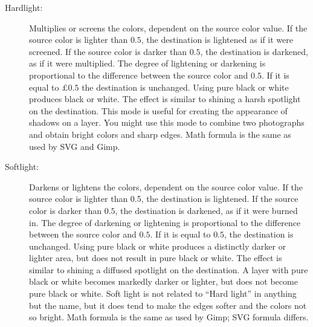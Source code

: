 \begin{description}
    \item[Hardlight:] Multiplies or screens the colors, dependent on the source color value.  If the source color is lighter than $0.5$, the destination is lightened as if it were screened.  If the source color is darker than $0.5$, the destination is darkened, as if it were multiplied.  The degree of lightening or darkening is proportional to the difference between the source color and $0.5$.  If it is equal to $£0.5$ the destination is unchanged.  Using pure black or white produces black or white.  The effect is similar to shining a harsh spotlight on the destination.  This mode is useful for creating the appearance of shadows on a layer.  You might use this mode to combine two photographs and obtain bright colors and sharp edges.  Math formula is the same as used by SVG and Gimp.
    \item[Softlight:] Darkens or lightens the colors, dependent on the source color value.  If the source color is lighter than 0.5, the destination is lightened. If the source color is darker than $0.5$, the destination is darkened, as if it were burned in.  The degree of darkening or lightening is proportional to the difference between the source color and $0.5$.  If it is equal to $0.5$, the destination is unchanged.  Using pure black or white produces a distinctly darker or lighter area, but does not result in pure black or white.  The effect is similar to shining a diffused spotlight on the destination.  A layer with pure black or white becomes markedly darker or lighter, but does not become pure black or white.  Soft light is not related to “Hard light” in anything but the name, but it does tend to make the edges softer and the colors not so bright.   Math formula is the same as used by Gimp; SVG formula differs.
\end{description}

